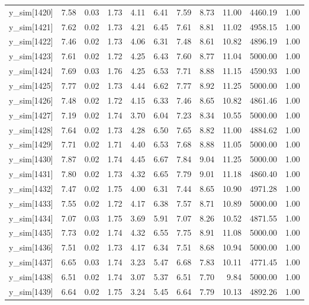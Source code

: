 \begin{table}[ht]
\begin{tabular}{rrrrrrrrrrr}
  y\_sim[1420] & 7.58 & 0.03 & 1.73 & 4.11 & 6.41 & 7.59 & 8.73 & 11.00 & 4460.19 & 1.00 \\ 
  y\_sim[1421] & 7.62 & 0.02 & 1.73 & 4.21 & 6.45 & 7.61 & 8.81 & 11.02 & 4958.15 & 1.00 \\ 
  y\_sim[1422] & 7.46 & 0.02 & 1.73 & 4.06 & 6.31 & 7.48 & 8.61 & 10.82 & 4896.19 & 1.00 \\ 
  y\_sim[1423] & 7.61 & 0.02 & 1.72 & 4.25 & 6.43 & 7.60 & 8.77 & 11.04 & 5000.00 & 1.00 \\ 
  y\_sim[1424] & 7.69 & 0.03 & 1.76 & 4.25 & 6.53 & 7.71 & 8.88 & 11.15 & 4590.93 & 1.00 \\ 
  y\_sim[1425] & 7.77 & 0.02 & 1.73 & 4.44 & 6.62 & 7.77 & 8.92 & 11.25 & 5000.00 & 1.00 \\ 
  y\_sim[1426] & 7.48 & 0.02 & 1.72 & 4.15 & 6.33 & 7.46 & 8.65 & 10.82 & 4861.46 & 1.00 \\ 
  y\_sim[1427] & 7.19 & 0.02 & 1.74 & 3.70 & 6.04 & 7.23 & 8.34 & 10.55 & 5000.00 & 1.00 \\ 
  y\_sim[1428] & 7.64 & 0.02 & 1.73 & 4.28 & 6.50 & 7.65 & 8.82 & 11.00 & 4884.62 & 1.00 \\ 
  y\_sim[1429] & 7.71 & 0.02 & 1.71 & 4.40 & 6.53 & 7.68 & 8.88 & 11.05 & 5000.00 & 1.00 \\ 
  y\_sim[1430] & 7.87 & 0.02 & 1.74 & 4.45 & 6.67 & 7.84 & 9.04 & 11.25 & 5000.00 & 1.00 \\ 
  y\_sim[1431] & 7.80 & 0.02 & 1.73 & 4.32 & 6.65 & 7.79 & 9.01 & 11.18 & 4860.40 & 1.00 \\ 
  y\_sim[1432] & 7.47 & 0.02 & 1.75 & 4.00 & 6.31 & 7.44 & 8.65 & 10.90 & 4971.28 & 1.00 \\ 
  y\_sim[1433] & 7.55 & 0.02 & 1.72 & 4.17 & 6.38 & 7.57 & 8.71 & 10.89 & 5000.00 & 1.00 \\ 
  y\_sim[1434] & 7.07 & 0.03 & 1.75 & 3.69 & 5.91 & 7.07 & 8.26 & 10.52 & 4871.55 & 1.00 \\ 
  y\_sim[1435] & 7.73 & 0.02 & 1.74 & 4.32 & 6.55 & 7.75 & 8.91 & 11.08 & 5000.00 & 1.00 \\ 
  y\_sim[1436] & 7.51 & 0.02 & 1.73 & 4.17 & 6.34 & 7.51 & 8.68 & 10.94 & 5000.00 & 1.00 \\ 
  y\_sim[1437] & 6.65 & 0.03 & 1.74 & 3.23 & 5.47 & 6.68 & 7.83 & 10.11 & 4771.45 & 1.00 \\ 
  y\_sim[1438] & 6.51 & 0.02 & 1.74 & 3.07 & 5.37 & 6.51 & 7.70 & 9.84 & 5000.00 & 1.00 \\ 
  y\_sim[1439] & 6.64 & 0.02 & 1.75 & 3.24 & 5.45 & 6.64 & 7.79 & 10.13 & 4892.26 & 1.00 \\ 

\end{tabular}
\end{table}

